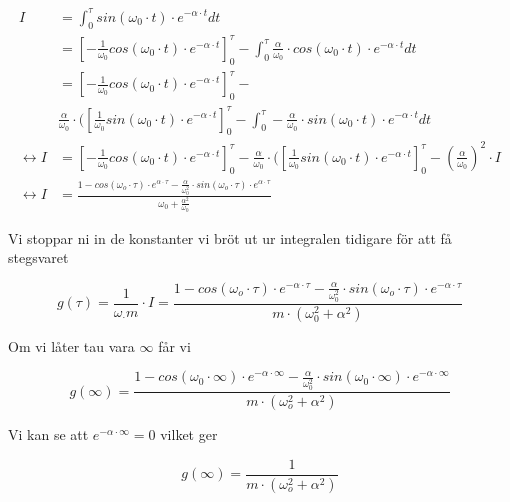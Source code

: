 \documentclass[10pt,a4paper]{article}
\begin{document}
\begin{equation}
\begin{split} 
I & = \int_0^\tau sin(\omega_0 \cdot t)\cdot e^{-\alpha \cdot t} dt  \\
& = [-\frac{1}{\omega_0} cos(\omega_0 \cdot t) \cdot e^{-\alpha \cdot t}]_0^\tau - \int_0^\tau \frac{\alpha}{\omega_0} \cdot cos(\omega_0 \cdot t) \cdot e^{-\alpha \cdot t} dt \\
& = [-\frac{1}{\omega_0} cos(\omega_0 \cdot t) \cdot e^{-\alpha \cdot t}]_0^\tau - \\
& \frac{\alpha}{\omega_0} \cdot ([\frac{1}{\omega_0} sin(\omega_0 \cdot t) \cdot e^{-\alpha \cdot t}]_0^\tau - \int_0^\tau -\frac{\alpha}{\omega_0} \cdot sin(\omega_0 \cdot t)\cdot e^{-\alpha \cdot t} dt \\
\leftrightarrow
I & = [-\frac{1}{\omega_0} cos(\omega_0 \cdot t) \cdot e^{-\alpha \cdot t}]_0^\tau - \frac{\alpha}{\omega_0} \cdot ([\frac{1}{\omega_0} sin(\omega_0 \cdot t) \cdot e^{-\alpha \cdot t}]_0^\tau - (\frac{\alpha}{\omega_0})^2 \cdot I \\
\leftrightarrow I & = \frac{1-cos(\omega_o \cdot \tau) \cdot e^{\alpha \cdot \tau} - \frac{\alpha}{\omega_0^2} \cdot sin(\omega_o \cdot \tau) \cdot e^{\alpha \cdot \tau}}{\omega_0 + \frac{\alpha^2}{\omega_0}}
\end{split}
\end{equation}

Vi stoppar ni in de konstanter vi bröt ut ur integralen tidigare för att få stegsvaret

\begin{equation}
g(\tau)= \frac{1}{\omega_ \cdot m} \cdot I = \frac{1-cos(\omega_o \cdot \tau) \cdot e^{-\alpha \cdot \tau} - \frac{\alpha}{\omega_0^2} \cdot sin(\omega_o \cdot \tau) \cdot e^{-\alpha \cdot \tau}}{m\cdot (\omega_0^2 + \alpha^2)}
\end{equation}

Om vi låter tau vara $\infty$ får vi

\begin{equation}
g(\infty) = \frac{1 - cos(\omega_0 \cdot \infty) \cdot e^{-\alpha \cdot \infty}
- \frac{\alpha}{\omega_0^2} \cdot sin(\omega_0 \cdot \infty) \cdot e^{-\alpha \cdot \infty}}{m \cdot (\omega_o^2 +\alpha^2)}
\end{equation}

Vi kan se att $e^{-\alpha \cdot \infty} = 0$ vilket ger

\begin{equation}
g(\infty) = \frac{1}{m \cdot (\omega_o^2 +\alpha^2)}
\end{equation}
\end{document}
